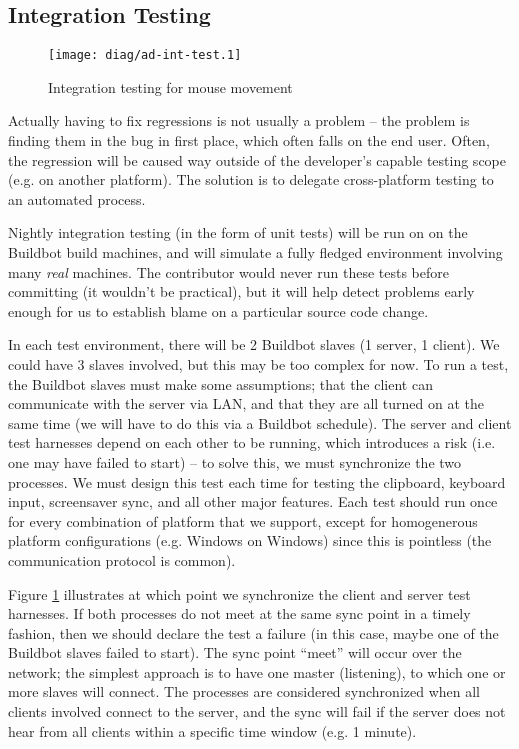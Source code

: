 \subsection{Integration Testing}

\begin{figure}[ht!]
  \centering
  \texttt{[image: diag/ad-int-test.1]}
  \caption{Integration testing for mouse movement}
  \label{fig:integrationTesting}
\end{figure}

Actually having to fix regressions is not usually a problem -- the problem is
finding them in the bug in first place, which often falls on the end user. 
Often, the regression will be caused way outside of the developer's capable 
testing scope (e.g. on another platform). The solution is to delegate 
cross-platform testing to an automated process.

Nightly integration testing (in the form of unit tests) will be run on on the 
Buildbot build machines, and will simulate a fully fledged environment involving
many \textit{real} machines. The contributor would never run these tests before
committing (it wouldn't be  practical), but it will help detect problems early
enough for us to establish blame on a particular source code change.

In each test environment, there will be 2 Buildbot slaves (1 server, 1 client).
We could have 3 slaves involved, but this may be too complex for now.
To run a test, the Buildbot slaves must make some assumptions; that the client
can communicate with the server via LAN, and that they are all turned on at the 
same time (we will have to do this via a Buildbot schedule). The server and 
client test harnesses depend on each other to be running, which introduces a
risk (i.e. one may have failed to start) -- to solve this, we must synchronize
the two processes. We must design this test each time for testing the clipboard,
keyboard input, screensaver sync, and all other major features. Each test should
run once for every combination of platform that we support, except for 
homogenerous platform configurations (e.g. Windows on Windows) since this is
pointless (the communication protocol is common).

Figure \ref{fig:integrationTesting} illustrates at which point we synchronize
the client and server test harnesses. If both processes do not meet at the same
sync point in a timely fashion, then we should declare the test a failure (in
this case, maybe one of the Buildbot slaves failed to start). The sync point
``meet'' will occur over the network; the simplest approach is to have one 
master (listening), to which one or more slaves will connect. The processes are
considered synchronized when all clients involved connect to the server, and
the sync will fail if the server does not hear from all clients within a 
specific time window (e.g. 1 minute).

